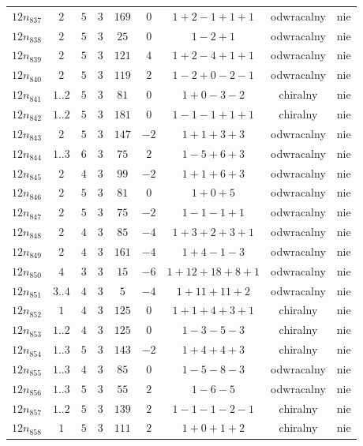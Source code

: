 \begin{longtable}{ccccccccc}
$12n_{837}$ & $2$ & $5$ & $3$ & $169$ & $0$ & $1+2-1+1+1$ & odwracalny & nie \\
$12n_{838}$ & $2$ & $5$ & $3$ & $25$ & $0$ & $1-2+1$ & odwracalny & nie \\
$12n_{839}$ & $2$ & $5$ & $3$ & $121$ & $4$ & $1+2-4+1+1$ & odwracalny & nie \\
$12n_{840}$ & $2$ & $5$ & $3$ & $119$ & $2$ & $1-2+0-2-1$ & odwracalny & nie \\
$12n_{841}$ & $1..2$ & $5$ & $3$ & $81$ & $0$ & $1+0-3-2$ & chiralny & nie \\
$12n_{842}$ & $1..2$ & $5$ & $3$ & $181$ & $0$ & $1-1-1+1+1$ & chiralny & nie \\
$12n_{843}$ & $2$ & $5$ & $3$ & $147$ & $-2$ & $1+1+3+3$ & odwracalny & nie \\
$12n_{844}$ & $1..3$ & $6$ & $3$ & $75$ & $2$ & $1-5+6+3$ & odwracalny & nie \\
$12n_{845}$ & $2$ & $4$ & $3$ & $99$ & $-2$ & $1+1+6+3$ & odwracalny & nie \\
$12n_{846}$ & $2$ & $5$ & $3$ & $81$ & $0$ & $1+0+5$ & odwracalny & nie \\
$12n_{847}$ & $2$ & $5$ & $3$ & $75$ & $-2$ & $1-1-1+1$ & odwracalny & nie \\
$12n_{848}$ & $2$ & $4$ & $3$ & $85$ & $-4$ & $1+3+2+3+1$ & odwracalny & nie \\
$12n_{849}$ & $2$ & $4$ & $3$ & $161$ & $-4$ & $1+4-1-3$ & odwracalny & nie \\
$12n_{850}$ & $4$ & $3$ & $3$ & $15$ & $-6$ & $1+12+18+8+1$ & odwracalny & nie \\
$12n_{851}$ & $3..4$ & $4$ & $3$ & $5$ & $-4$ & $1+11+11+2$ & odwracalny & nie \\
$12n_{852}$ & $1$ & $4$ & $3$ & $125$ & $0$ & $1+1+4+3+1$ & chiralny & nie \\
$12n_{853}$ & $1..2$ & $4$ & $3$ & $125$ & $0$ & $1-3-5-3$ & chiralny & nie \\
$12n_{854}$ & $1..3$ & $5$ & $3$ & $143$ & $-2$ & $1+4+4+3$ & chiralny & nie \\
$12n_{855}$ & $1..3$ & $4$ & $3$ & $85$ & $0$ & $1-5-8-3$ & odwracalny & nie \\
$12n_{856}$ & $1..3$ & $5$ & $3$ & $55$ & $2$ & $1-6-5$ & odwracalny & nie \\
$12n_{857}$ & $1..2$ & $5$ & $3$ & $139$ & $2$ & $1-1-1-2-1$ & chiralny & nie \\
$12n_{858}$ & $1$ & $5$ & $3$ & $111$ & $2$ & $1+0+1+2$ & chiralny & nie \\

\end{longtable}
